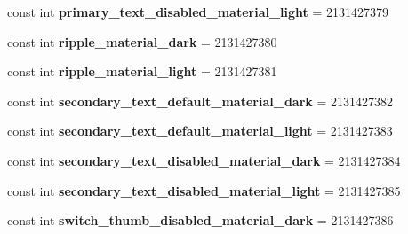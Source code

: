 \begin{DoxyCompactItemize}
\item 
\mbox{\label{class_sample_app_1_1_droid_1_1_resource_1_1_color_ada40ff0bdbaad5b8b5843d7bcce90b5e}} 
const int {\bfseries primary\+\_\+text\+\_\+disabled\+\_\+material\+\_\+light} = 2131427379
\item 
\mbox{\label{class_sample_app_1_1_droid_1_1_resource_1_1_color_a825bcee7bb548c80cd091c3d732fd8b1}} 
const int {\bfseries ripple\+\_\+material\+\_\+dark} = 2131427380
\item 
\mbox{\label{class_sample_app_1_1_droid_1_1_resource_1_1_color_a22b6d0037d70357774b22ad2023b0dce}} 
const int {\bfseries ripple\+\_\+material\+\_\+light} = 2131427381
\item 
\mbox{\label{class_sample_app_1_1_droid_1_1_resource_1_1_color_ad156dc2232af0142b1f00ce6909ce161}} 
const int {\bfseries secondary\+\_\+text\+\_\+default\+\_\+material\+\_\+dark} = 2131427382
\item 
\mbox{\label{class_sample_app_1_1_droid_1_1_resource_1_1_color_a22c17c6f673417597bfe0f44565893ba}} 
const int {\bfseries secondary\+\_\+text\+\_\+default\+\_\+material\+\_\+light} = 2131427383
\item 
\mbox{\label{class_sample_app_1_1_droid_1_1_resource_1_1_color_ac7a620ad146515974d4e4fc24f76a806}} 
const int {\bfseries secondary\+\_\+text\+\_\+disabled\+\_\+material\+\_\+dark} = 2131427384
\item 
\mbox{\label{class_sample_app_1_1_droid_1_1_resource_1_1_color_a69237f5b8ba8aba5960a66f5810fe484}} 
const int {\bfseries secondary\+\_\+text\+\_\+disabled\+\_\+material\+\_\+light} = 2131427385
\item 
\mbox{\label{class_sample_app_1_1_droid_1_1_resource_1_1_color_a9bf3756fe2b0b80a99c927b73de97ffd}} 
const int {\bfseries switch\+\_\+thumb\+\_\+disabled\+\_\+material\+\_\+dark} = 2131427386

\end{DoxyCompactItemize}
